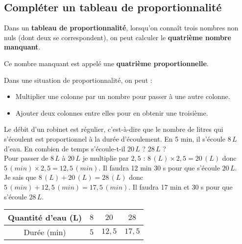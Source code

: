 \begin{pageCours} 

\section{Compléter un tableau de proportionnalité}

\begin{Def}
Dans un \textbf{tableau de proportionnalité}, lorsqu'on connaît trois nombres non nuls (dont deux se correspondent), on peut calculer le \textbf{quatrième nombre manquant}.

Ce nombre manquant est appelé une \textbf{quatrième proportionnelle}.
\end{Def}

\begin{Pp}
Dans une situation de proportionnalité, on peut :
\begin{itemize}[leftmargin=*]
\item Multiplier une colonne par un nombre pour passer à une autre colonne.
\item Ajouter deux colonnes entre elles pour en obtenir une troisième.
\end{itemize}
\end{Pp} 

\begin{Ex}
Le débit d'un robinet est régulier, c'est-à-dire que le nombre de litres qui s'écoulent est proportionnel à la durée d'écoulement. En 5 min, il s'écoule $8 \,L$ d'eau. En combien de temps s'écoule-t-il $20 \,L$ ? $28\,L$ ?\\

Pour passer de $8\,L$ à $20\,L$ je multiplie par $2,5$ : $8\,(L)\times2,5=20\,(L)$ donc $5\,(min)\times2,5=12,5\,(min)$. Il faudra 12 min 30 s pour que s'écoule $20\,L$.\\


Je sais que $8\,(L)+20\,(L)=28\,(L)$ donc $5\,(min)+12,5\,(min)=17,5\,(min)$. Il faudra 17 min et 30 s pour que s'écoule $28\,L$.\\
\begin{center}
    \begin{tabular}{|c|c|c|c|}\hline 
        Quantité d'eau (L) & $8$ & $20$ & $28$  \\\hline 
        Durée (min) & $5$ & $12,5$ & $17,5$ \\\hline 
    \end{tabular}
\end{center}
\end{Ex}



\end{pageCours} 
